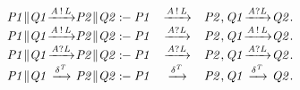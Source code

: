 \[
\begin{array}{r@{}c@{}lcr@{}c@{}lr@{}c@{}l}
\Prule{\Tstep{\Tpar{\Tvar{P1}}{\Tvar{Q1}}}{\Tsay{\Tvar{A}}{\Tvar{L}}}{\Tpar{\Tvar{P2}}{\Tvar{Q2}}}}{\Tstep{\Tvar{P1}}{\Tsay{\Tvar{A}}{\Tvar{L}}}{\Tvar{P2}},\Tstep{\Tvar{Q1}}{\Thear{\Tvar{A}}{\Tvar{L}}}{\Tvar{Q2}}}.
\\\Prule{\Tstep{\Tpar{\Tvar{P1}}{\Tvar{Q1}}}{\Tsay{\Tvar{A}}{\Tvar{L}}}{\Tpar{\Tvar{P2}}{\Tvar{Q2}}}}{\Tstep{\Tvar{P1}}{\Thear{\Tvar{A}}{\Tvar{L}}}{\Tvar{P2}},\Tstep{\Tvar{Q1}}{\Tsay{\Tvar{A}}{\Tvar{L}}}{\Tvar{Q2}}}.
\\\Prule{\Tstep{\Tpar{\Tvar{P1}}{\Tvar{Q1}}}{\Thear{\Tvar{A}}{\Tvar{L}}}{\Tpar{\Tvar{P2}}{\Tvar{Q2}}}}{\Tstep{\Tvar{P1}}{\Thear{\Tvar{A}}{\Tvar{L}}}{\Tvar{P2}},\Tstep{\Tvar{Q1}}{\Thear{\Tvar{A}}{\Tvar{L}}}{\Tvar{Q2}}}.
\\\Prule{\Tstep{\Tpar{\Tvar{P1}}{\Tvar{Q1}}}{\Tdelta{\Tvar{T}}}{\Tpar{\Tvar{P2}}{\Tvar{Q2}}}}{\Tstep{\Tvar{P1}}{\Tdelta{\Tvar{T}}}{\Tvar{P2}},\Tstep{\Tvar{Q1}}{\Tdelta{\Tvar{T}}}{\Tvar{Q2}}}.
\end{array}
\]

